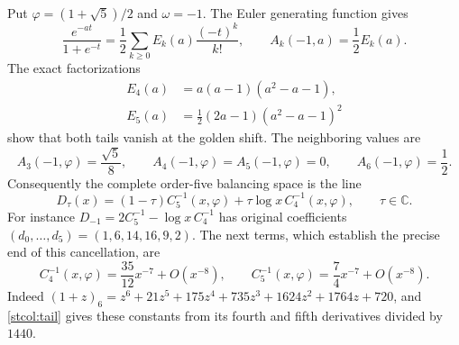 Put $\varphi=(1+\sqrt5)/2$ and $\omega=-1$.
The Euler generating function gives
\[
 \frac{e^{-at}}{1+e^{-t}}=\frac12\sum_{k\ge0}E_k(a)\frac{(-t)^k}{k!},
 \qquad A_k(-1,a)=\frac12E_k(a).
\]
The exact factorizations
\begin{align}
 E_4(a)&=a(a-1)(a^2-a-1),\label{stcol:euler4}\\
 E_5(a)&=\tfrac12(2a-1)(a^2-a-1)^2\label{stcol:euler5}
\end{align}
show that both tails vanish at the golden shift.  The neighboring
values are
\begin{equation}\label{stcol:golden-tails}
 A_3(-1,\varphi)=\frac{\sqrt5}{8},\qquad
 A_4(-1,\varphi)=A_5(-1,\varphi)=0,\qquad
 A_6(-1,\varphi)=\frac12.
\end{equation}
Consequently the complete order-five balancing space is the line
\begin{equation}\label{stcol:golden-family}
 D_\tau(x)=(1-\tau)C_5^{-1}(x,\varphi)
           +\tau\log x\,C_4^{-1}(x,\varphi),\qquad \tau\in\mathbb C.
\end{equation}
For instance $D_{-1}=2C_5^{-1}-\log x\,C_4^{-1}$ has original
coefficients $(d_0,\ldots,d_5)=(1,6,14,16,9,2)$.
The next terms, which establish the precise end of this cancellation,
are
\begin{equation}\label{stcol:golden-leading}
 C_4^{-1}(x,\varphi)=\frac{35}{12}x^{-7}+O(x^{-8}),\qquad
 C_5^{-1}(x,\varphi)=\frac74x^{-7}+O(x^{-8}).
\end{equation}
Indeed $(1+z)_6=z^6+21z^5+175z^4+735z^3+1624z^2+1764z+720$,
and \eqref{stcol:tail} gives these constants from its fourth and fifth
derivatives divided by $1440$.


